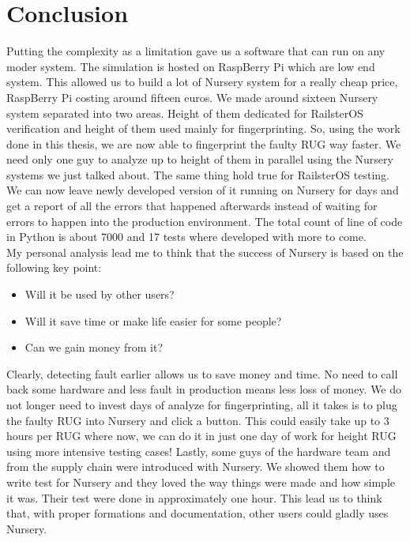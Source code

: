\documentclass[12pt]{article}
\theoremstyle{definition}
\theoremstyle{definition}
\theoremstyle{remark}
\begin{document}

\clearpage
\part{Conclusion}

Putting the complexity as a limitation gave us a software that can run on any moder system. The simulation is hosted on RaspBerry Pi which are low end system. This allowed us to build a lot of Nursery system for a really cheap price, RaspBerry Pi costing around fifteen euros. We made around sixteen Nursery system separated into two areas. Height of them dedicated for RailsterOS verification and height of them used mainly for fingerprinting. So, using the work done in this thesis, we are now able to fingerprint the faulty RUG way faster. We need only one guy to analyze up to height of them in parallel using the Nursery systems we just talked about. The same thing hold true for RailsterOS testing. We can now leave newly developed version of it running on Nursery for days and get a report of all the errors that happened afterwards instead of waiting for errors to happen into the production environment. The total count of line of code in Python is about 7000 and 17 tests where developed with more to come.\\

My personal analysis lead me to think that the success of Nursery is based on the following key point:
\begin{itemize}
\item Will it be used by other users?
\item Will it save time or make life easier for some people?
\item Can we gain money from it?
\end{itemize}

Clearly, detecting fault earlier allows us to save money and time. No need to call back some hardware and less fault in production means less loss of money. We do not longer need to invest days of analyze for fingerprinting, all it takes is to plug the faulty RUG into Nursery and click a button. This could easily take up to 3 hours per RUG where now, we can do it in just one day of work for height RUG using more intensive testing cases! Lastly, some guys of the hardware team and from the supply chain were introduced with Nursery. We showed them how to write test for Nursery and they loved the way things were made and how simple it was. Their test were done in approximately one hour. This lead us to think that, with proper formations and documentation, other users could gladly uses Nursery.\\
\end{document}
